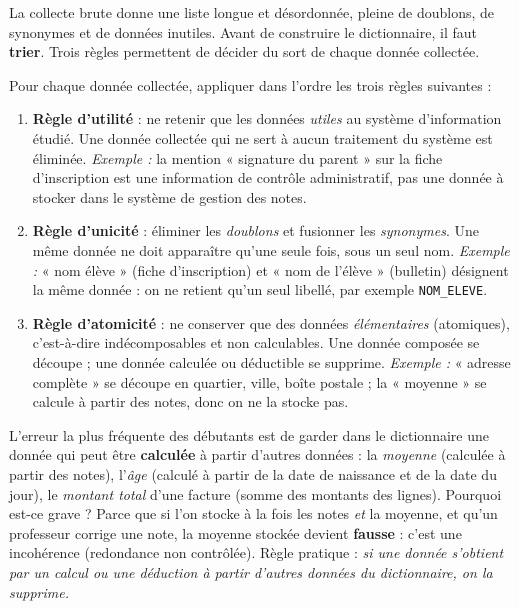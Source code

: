 \documentclass[11pt]{article}
\newcounter{popsec}
\newcounter{popsub}
\newcommand{\courssub}[1]{%
  \stepcounter{popsub}%
  \par\vspace{9pt}\noindent{\popxbold\fontsize{11.5}{13}\selectfont\color{popink}{\color{poporange}\thepopsec.\thepopsub}\hspace{6pt}#1}\par\nopagebreak\vspace{4pt}
}
\begin{document}
\courssub{Trier les données : les trois règles d'or}

La collecte brute donne une liste longue et désordonnée, pleine de doublons, de synonymes et de données inutiles. Avant de construire le dictionnaire, il faut \textbf{trier}. Trois règles permettent de décider du sort de chaque donnée collectée.

\begin{methode}
Pour chaque donnée collectée, appliquer dans l'ordre les trois règles suivantes :
\begin{enumerate}
  \item \textbf{Règle d'utilité} : ne retenir que les données \emph{utiles} au système d'information étudié. Une donnée collectée qui ne sert à aucun traitement du système est éliminée. \emph{Exemple :} la mention « signature du parent » sur la fiche d'inscription est une information de contrôle administratif, pas une donnée à stocker dans le système de gestion des notes.
  \item \textbf{Règle d'unicité} : éliminer les \emph{doublons} et fusionner les \emph{synonymes}. Une même donnée ne doit apparaître qu'une seule fois, sous un seul nom. \emph{Exemple :} « nom élève » (fiche d'inscription) et « nom de l'élève » (bulletin) désignent la même donnée : on ne retient qu'un seul libellé, par exemple \texttt{NOM\_ELEVE}.
  \item \textbf{Règle d'atomicité} : ne conserver que des données \emph{élémentaires} (atomiques), c'est-à-dire indécomposables et non calculables. Une donnée composée se découpe ; une donnée calculée ou déductible se supprime. \emph{Exemple :} « adresse complète » se découpe en quartier, ville, boîte postale ; la « moyenne » se calcule à partir des notes, donc on ne la stocke pas.
\end{enumerate}
\end{methode}

\begin{attention}
L'erreur la plus fréquente des débutants est de garder dans le dictionnaire une donnée qui peut être \textbf{calculée} à partir d'autres données : la \emph{moyenne} (calculée à partir des notes), l'\emph{âge} (calculé à partir de la date de naissance et de la date du jour), le \emph{montant total} d'une facture (somme des montants des lignes). Pourquoi est-ce grave ? Parce que si l'on stocke à la fois les notes \emph{et} la moyenne, et qu'un professeur corrige une note, la moyenne stockée devient \textbf{fausse} : c'est une incohérence (redondance non contrôlée). Règle pratique : \emph{si une donnée s'obtient par un calcul ou une déduction à partir d'autres données du dictionnaire, on la supprime.}
\end{attention}
\end{document}
